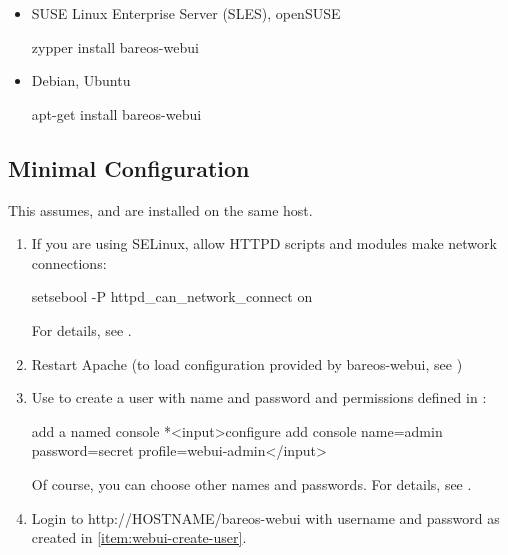 \begin{itemize}
 \item SUSE Linux Enterprise Server (SLES), openSUSE
\begin{commands}{}
zypper install bareos-webui
\end{commands}
\end{itemize}

\begin{itemize}
 \item Debian, Ubuntu
\begin{commands}{}
apt-get install bareos-webui
\end{commands}
\end{itemize}

\subsection{Minimal Configuration}

This assumes, \bareosDir and \bareosWebui are installed on the same host.

\begin{enumerate}

\item If you are using SELinux, allow HTTPD scripts and modules make network connections:
\begin{commands}{}
setsebool -P httpd_can_network_connect on
\end{commands}
For details, see .

\item Restart Apache (to load configuration provided by bareos-webui, see )

\item \label{item:webui-create-user}
Use  to create a user with name  and password  and permissions defined in :
\begin{bconsole}{add a named console}
*<input>configure add console name=admin password=secret profile=webui-admin</input>
\end{bconsole}
Of course, you can choose other names and passwords.
For details, see .

\item Login to http://HOSTNAME/bareos-webui with username and password as created in \ref{item:webui-create-user}.

\end{enumerate}


